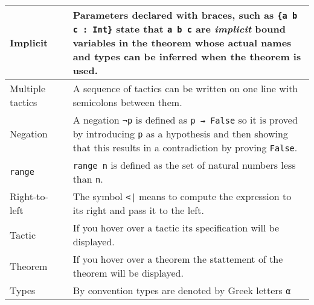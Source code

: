 \begin{tabular}{p{}|r|p{}}
Implicit&\pageref{p.implicit}&Parameters declared with braces, such as \Verb+{a b c : Int}+ state that \Verb+a b c+ are \emph{implicit} bound variables in the theorem whose actual names and types can be inferred when the theorem is used.\\\hline

Multiple tactics& \pageref{p.multiple}&A sequence of tactics can be written on one line with semicolons between them.\\\hline

Negation&\pageref{p.negation}&A negation \Verb+¬p+ is defined as \Verb+p → False+ so it is proved by introducing \Verb+p+ as a hypothesis and then showing that this results in a contradiction by proving \Verb+False+.\\\hline

\Verb+range+&\pageref{p.range}&\Verb+range n+ is defined as the set of natural numbers less than \Verb+n+.\\\hline

Right-to-left&\pageref{p.right-to-left}&The symbol \Verb+<|+ means to compute the expression to its right and pass it to the left.\\\hline

Tactic&\pageref{p.tactic}&If you hover over a tactic its specification will be displayed.\\\hline

Theorem&\pageref{p.theorem}&If you hover over a theorem the stattement of the theorem will be displayed.\\\hline

Types&\pageref{p.types}&By convention types are denoted by Greek letters \Verb+α+\\\hline
\end{tabular}

